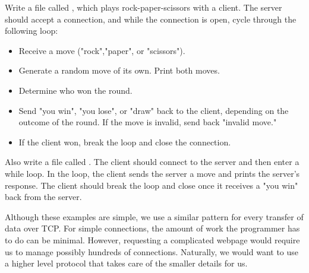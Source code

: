 \begin{problem}
Write a file called , which plays rock-paper-scissors with a client. The server should accept a connection, and while the connection is open, cycle through the following loop:
\begin {itemize}
	\item{Receive a move ("rock","paper", or "scissors").}
	\item{Generate a random move of its own. Print both moves.}
	\item{Determine who won the round.}
	\item{Send "you win", "you lose", or "draw" back to the client, depending on the outcome of the round. If the move is invalid, send back "invalid move."}
	\item{If the client won, break the loop and close the connection.}
\end{itemize}

Also write a file called . The client should connect to the server and then enter a while loop. In the loop, the client sends the server a move and prints the server's response. The client should break the loop and close once it receives a "you win" back from the server.
\end{problem}

Although these examples are simple, we use a similar pattern for every transfer of data over TCP.
For simple connections, the amount of work the programmer has to do can be minimal.
However, requesting a complicated webpage would require us to manage possibly hundreds of connections.
Naturally, we would want to use a higher level protocol that takes care of the smaller details for us.


%

%


